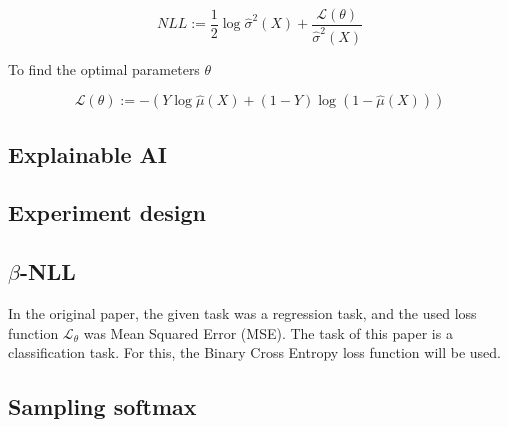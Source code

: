 \begin{equation}
    NLL := \frac{1}{2}\log \hat{\sigma}^2(X) + \frac{\mathcal{L}(\theta)}{\hat{\sigma}^2(X)}
\end{equation}

To find the optimal parameters $\theta$

\begin{equation}
    \mathcal{L}(\theta) := - ( Y \log \hat{\mu}(X) + (1 - Y) \log (1 - \hat{\mu}(X)) )
\end{equation}

\subsection{Explainable AI}

\subsection{Experiment design}




\subsection{$\beta$-NLL}

In the original paper, the given task was a regression task, and the used loss function $\mathcal{L_{\theta}}$ was Mean Squared Error (MSE). The task of this paper is a classification task. For this, the Binary Cross Entropy loss function will be used.

\subsection{Sampling softmax}